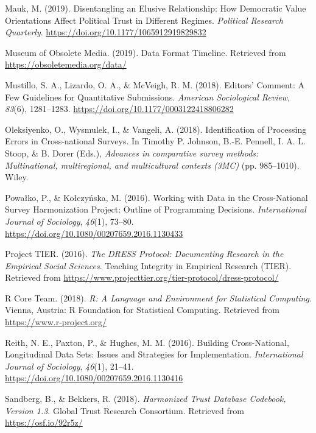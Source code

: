 \documentclass[12pt,]{article}
\begin{document}
\leavevmode\hypertarget{ref-Mauk2019}{}%
Mauk, M. (2019). Disentangling an Elusive Relationship: How Democratic Value Orientations Affect Political Trust in Different Regimes. \emph{Political Research Quarterly}. \url{https://doi.org/10.1177/1065912919829832}

\leavevmode\hypertarget{ref-MuseumofObsoleteMedia2019}{}%
Museum of Obsolete Media. (2019). Data Format Timeline. Retrieved from \url{https://obsoletemedia.org/data/}

\leavevmode\hypertarget{ref-Mustillo2018}{}%
Mustillo, S. A., Lizardo, O. A., \& McVeigh, R. M. (2018). Editors' Comment: A Few Guidelines for Quantitative Submissions. \emph{American Sociological Review}, \emph{83}(6), 1281--1283. \url{https://doi.org/10.1177/0003122418806282}

\leavevmode\hypertarget{ref-Oleksiyenko2018}{}%
Oleksiyenko, O., Wysmulek, I., \& Vangeli, A. (2018). Identification of Processing Errors in Cross‐national Surveys. In Timothy P. Johnson, B.-E. Pennell, I. A. L. Stoop, \& B. Dorer (Eds.), \emph{Advances in comparative survey methods: Multinational, multiregional, and multicultural contexts (3MC)} (pp. 985--1010). Wiley.

\leavevmode\hypertarget{ref-Powako2016}{}%
Powałko, P., \& Kołczyńska, M. (2016). Working with Data in the Cross-National Survey Harmonization Project: Outline of Programming Decisions. \emph{International Journal of Sociology}, \emph{46}(1), 73--80. \url{https://doi.org/10.1080/00207659.2016.1130433}

\leavevmode\hypertarget{ref-ProjectTIER2016}{}%
Project TIER. (2016). \emph{The DRESS Protocol: Documenting Research in the Empirical Social Sciences}. Teaching Integrity in Empirical Research (TIER). Retrieved from \url{https://www.projecttier.org/tier-protocol/dress-protocol/}

\leavevmode\hypertarget{ref-baser}{}%
R Core Team. (2018). \emph{R: A Language and Environment for Statistical Computing}. Vienna, Austria: R Foundation for Statistical Computing. Retrieved from \url{https://www.r-project.org/}

\leavevmode\hypertarget{ref-Reith2016}{}%
Reith, N. E., Paxton, P., \& Hughes, M. M. (2016). Building Cross-National, Longitudinal Data Sets: Issues and Strategies for Implementation. \emph{International Journal of Sociology}, \emph{46}(1), 21--41. \url{https://doi.org/10.1080/00207659.2016.1130416}

\leavevmode\hypertarget{ref-Sandberg2018}{}%
Sandberg, B., \& Bekkers, R. (2018). \emph{Harmonized Trust Database Codebook, Version 1.3}. Global Trust Research Consortium. Retrieved from \url{https://osf.io/92r5z/}
\end{document}

